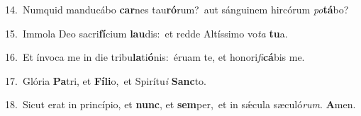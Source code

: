 {\numbfont\textcolor{\numbcolor}{14.}}~Numquid manducábo \textbf{car}\-nes tau\-\textbf{ró}\-rum?~\star aut sánguinem hircórum \textit{po}\-\textbf{tá}bo?\par
{\numbfont\textcolor{\numbcolor}{15.}}~Immola Deo sacri\-\textbf{fí}\-cium \textbf{lau}\-dis:~\star et redde Altíssimo vo\textit{ta} \textbf{tu}\-a.\par
{\numbfont\textcolor{\numbcolor}{16.}}~Et ínvoca me in die tribu\-\textbf{la}\-ti\-\textbf{ó}\-nis:~\star éruam te, et honori\-\textit{fi}\-\textbf{cá}bis me.\par
{\numbfont\textcolor{\numbcolor}{17.}}~Glória \textbf{Pa}\-tri, et \textbf{Fí}\-\textbf{li}o,~\star et Spirítu\textit{i} \textbf{Sanc}\-to.\par
{\numbfont\textcolor{\numbcolor}{18.}}~Sicut erat in princípio, et \textbf{nunc}\-, et \textbf{sem}\-per,~\star et in sǽcula sæculó\-\textit{rum}\-. \textbf{A}\-men.\par
